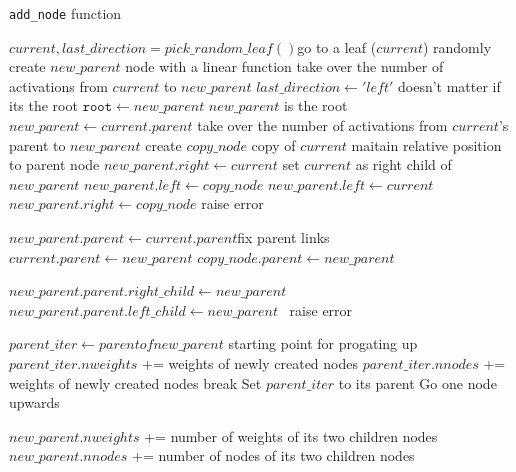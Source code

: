 \begin{algorithm}[!ht]
\caption{\texttt{add\_node} function}
\label{algo:pseudo_add_node_function}
\begin{algorithmic}
\State $current, last\_direction = pick\_random\_leaf()$\Comment go to a leaf ($current$) randomly
    \State create $new\_parent$ node with a linear function
    \State take over the number of activations from $current$ to $new\_parent$
    \State $last\_direction \gets 'left'$ \Comment doesn't matter if its the root
    \State $\texttt{root} \gets new\_parent$ \Comment $new\_parent$ is the root
\Else
    \State $new\_parent \gets current.parent$
    \State take over the number of activations from $current$'s parent to $new\_parent$
\EndIf
\State create $copy\_node$ \Comment copy of $current$
\Comment maitain relative position to parent node
    \State $new\_parent.right \gets current$ \Comment set $current$ as right child of $new\_parent$
    \State $new\_parent.left \gets copy\_node$
    \State $new\_parent.left \gets current$
    \State $new\_parent.right \gets copy\_node$
\Else
    \State raise error
\EndIf

\State $new\_parent.parent \gets current.parent$\Comment fix parent links
\State $current.parent \gets new\_parent$
\State $copy\_node.parent \gets new\_parent$

        \State $new\_parent.parent.right\_child \gets new\_parent$\
        \State $new\_parent.parent.left\_child \gets new\_parent$\
    \Else
        \State raise error
    \EndIf
\EndIf

    \State $parent\_iter \gets parent of new\_parent$ \Comment starting point for progating up
    \While{True}
        \State $parent\_iter.nweights$ += weights of newly created nodes
        \State $parent\_iter.nnodes$ += weights of newly created nodes
        \If{$parent\_iter$ is root}
            \State break
        \Else
            \State Set $parent\_iter$ to its parent \Comment Go one node upwards
        \EndIf

    \EndWhile
\EndIf

\State $new\_parent.nweights$ += number of weights of its two children nodes
\State $new\_parent.nnodes$ += number of nodes of its two children nodes

\EndFunction
\end{algorithmic}
\end{algorithm}

